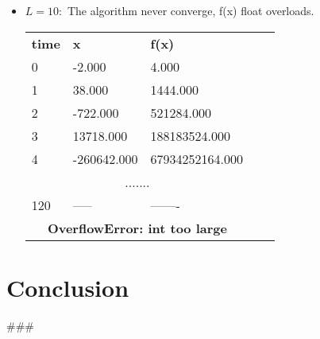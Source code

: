 \documentclass{article}
\begin{document}
\begin{itemize}
    \item \textbf{$L = 10:$} The algorithm never converge, f(x) float overloads.
    \begin{table}[]
        \begin{tabular}{|lll|ll}
        \cline{1-3}
        \multicolumn{1}{|l|}{\textbf{time}} & \multicolumn{1}{l|}{\textbf{x}}  & \textbf{f(x)}   &  &  \\ \cline{1-3}
        \multicolumn{1}{|l|}{0}             & \multicolumn{1}{l|}{-2.000}      & 4.000           &  &  \\ \cline{1-3}
        \multicolumn{1}{|l|}{1}             & \multicolumn{1}{l|}{38.000}      & 1444.000        &  &  \\ \cline{1-3}
        \multicolumn{1}{|l|}{2}             & \multicolumn{1}{l|}{-722.000}    & 521284.000      &  &  \\ \cline{1-3}
        \multicolumn{1}{|l|}{3}             & \multicolumn{1}{l|}{13718.000}   & 188183524.000   &  &  \\ \cline{1-3}
        \multicolumn{1}{|l|}{4}             & \multicolumn{1}{l|}{-260642.000} & 67934252164.000 &  &  \\ \cline{1-3}
        \multicolumn{3}{|c|}{.......}                                                            &  &  \\ \cline{1-3}
        \multicolumn{1}{|l|}{120}           & \multicolumn{1}{l|}{-----}       & -------         &  &  \\ \cline{1-3}
        \multicolumn{3}{|c|}{\textbf{OverflowError: int too large}}                              &  &  \\ \cline{1-3}
        \end{tabular}
        \end{table}
\end{itemize}

\section{Conclusion}
###
\end{document}
